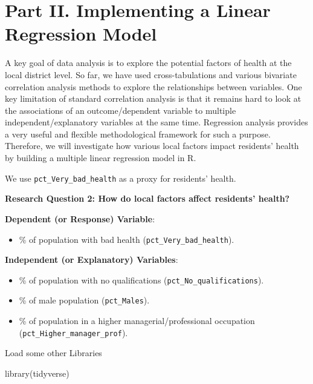 \documentclass[
  letterpaper,
  DIV=11,
  numbers=noendperiod]{scrreprt}
\newenvironment{Shaded}{\begin{snugshade}}{\end{snugshade}}
\newcommand{\FunctionTok}[1]{\textcolor[rgb]{0.28,0.35,0.67}{#1}}
\newcommand{\NormalTok}[1]{\textcolor[rgb]{0.00,0.23,0.31}{#1}}
\providecommand{\tightlist}{%
  \setlength{\itemsep}{0pt}\setlength{\parskip}{0pt}}
\begin{document}
\section{Part II. Implementing a Linear Regression
Model}\label{part-ii.-implementing-a-linear-regression-model}

A key goal of data analysis is to explore the potential factors of
health at the local district level. So far, we have used
cross-tabulations and various bivariate correlation analysis methods to
explore the relationships between variables. One key limitation of
standard correlation analysis is that it remains hard to look at the
associations of an outcome/dependent variable to multiple
independent/explanatory variables at the same time. Regression analysis
provides a very useful and flexible methodological framework for such a
purpose. Therefore, we will investigate how various local factors impact
residents' health by building a multiple linear regression model in R.

We use \texttt{pct\_Very\_bad\_health} as a proxy for residents' health.

\textbf{Research Question 2: How do local factors affect residents'
health?}

\textbf{Dependent (or Response) Variable}:

\begin{itemize}
\tightlist
\item
  \% of population with bad health (\texttt{pct\_Very\_bad\_health}).
\end{itemize}

\textbf{Independent (or Explanatory) Variables}:

\begin{itemize}
\tightlist
\item
  \% of population with no qualifications
  (\texttt{pct\_No\_qualifications}).
\item
  \% of male population (\texttt{pct\_Males}).
\item
  \% of population in a higher managerial/professional occupation
  (\texttt{pct\_Higher\_manager\_prof}).
\end{itemize}

Load some other Libraries

\begin{Shaded}
\begin{Highlighting}[]
\FunctionTok{library}\NormalTok{(tidyverse)}
\end{Highlighting}
\end{Shaded}
\end{document}
